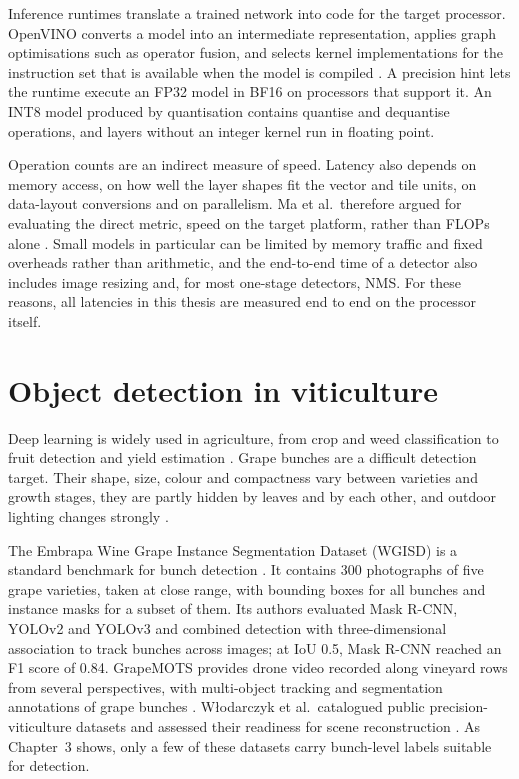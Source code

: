 \documentclass[a4paper,11pt,twoside]{report}
\theoremstyle{definition}
\begin{document}
Inference runtimes translate a trained network into code for the target processor. OpenVINO converts a model into an intermediate representation, applies graph optimisations such as operator fusion, and selects kernel implementations for the instruction set that is available when the model is compiled \cite{OpenVINO}. A precision hint lets the runtime execute an FP32 model in BF16 on processors that support it. An INT8 model produced by quantisation contains quantise and dequantise operations, and layers without an integer kernel run in floating point.

Operation counts are an indirect measure of speed. Latency also depends on memory access, on how well the layer shapes fit the vector and tile units, on data-layout conversions and on parallelism. Ma et al.\ therefore argued for evaluating the direct metric, speed on the target platform, rather than FLOPs alone \cite{Ma2018ShuffleNetV2, Sze2017EfficientProcessing}. Small models in particular can be limited by memory traffic and fixed overheads rather than arithmetic, and the end-to-end time of a detector also includes image resizing and, for most one-stage detectors, NMS. For these reasons, all latencies in this thesis are measured end to end on the processor itself.

\section{Object detection in viticulture}
\label{sec:rw_viticulture}

Deep learning is widely used in agriculture, from crop and weed classification to fruit detection and yield estimation \cite{Kamilaris2018DLAgriculture}. Grape bunches are a difficult detection target. Their shape, size, colour and compactness vary between varieties and growth stages, they are partly hidden by leaves and by each other, and outdoor lighting changes strongly \cite{Santos2020WGISD}.

The Embrapa Wine Grape Instance Segmentation Dataset (WGISD) is a standard benchmark for bunch detection \cite{Santos2020WGISD}. It contains 300 photographs of five grape varieties, taken at close range, with bounding boxes for all bunches and instance masks for a subset of them. Its authors evaluated Mask R-CNN, YOLOv2 and YOLOv3 and combined detection with three-dimensional association to track bunches across images; at IoU 0.5, Mask R-CNN reached an F1 score of 0.84. GrapeMOTS provides drone video recorded along vineyard rows from several perspectives, with multi-object tracking and segmentation annotations of grape bunches \cite{ArizaSentis2024GrapeMOTS}. W{\l}odarczyk et al.\ catalogued public precision-viticulture datasets and assessed their readiness for scene reconstruction \cite{Wlodarczyk2026GrapesReady}. As Chapter~3 shows, only a few of these datasets carry bunch-level labels suitable for detection.
\end{document}

